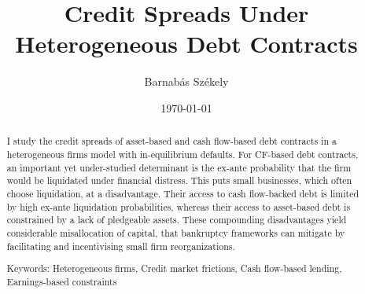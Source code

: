 \documentclass[12pt]{article}
\title{Credit Spreads Under Heterogeneous Debt Contracts}
\date{}
\begin{document}
\author{Barnabás Székely}
\date{\today}
\vspace{-1in}

\maketitle

\begin{abstract}
\noindent

I study the credit spreads of asset-based and cash flow-based debt contracts in a heterogeneous firms model with in-equilibrium defaults. For CF-based debt contracts, an important yet under-studied determinant is the ex-ante probability that the firm would be liquidated under financial distress. This puts small businesses, which often choose liquidation, at a disadvantage. Their access to cash flow-backed debt is limited by high ex-ante liquidation probabilities, whereas their access to asset-based debt is constrained by a lack of pledgeable assets. These compounding disadvantages yield considerable misallocation of capital, that bankruptcy frameworks can mitigate by facilitating and incentivising small firm reorganizations.

\bigskip{}
\bigskip{}

Keywords: Heterogeneous firms, Credit market frictions, Cash flow-based lending, Earnings-based constraints

\medskip{}
\end{abstract}
\thispagestyle{empty}

\pagebreak{}
\end{document}
